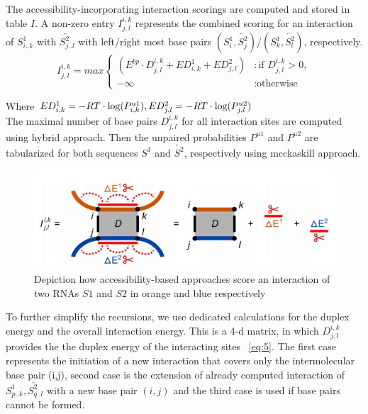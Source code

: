 \documentclass[twoside,a4paper]{report}
\begin{document}
	The accessibility-incorporating interaction scorings
	are computed and stored in table $I$. A non-zero entry $I^{i,k}_{j,l}$
	represents the combined scoring for an interaction of
	$S^1_{i..k}$ with $\overleftarrow{S^2_{j..l}}$ with
	left/right most base pairs $(S^1_i,\overleftarrow{S^2_j})$/$(S^1_k,\overleftarrow{S^2_l})$, respectively.\\


	\begin{equation}
	\label{eq:4}
	I^{i, k}_{j, l} = max \begin{cases}
	(E^{bp} \cdot D^{i, k}_{j, l} +ED^{1}_{i,k} +ED^{2}_{j, l}) & : \text{if } D^{i, k}_{j, l} > 0  ,\\-\infty & :\text{otherwise}
	\end{cases}
	\end{equation}
	
	 Where $ED^{1}_{i,k} = - RT \cdot \log(P^{u1}_{i,k}),\\ ED^{2}_{j, l} =  - RT \cdot \log(P^{u2}_{j, l})$\\
	 
	The maximal number of base pairs $D^{i,k}_{j,l}$ for all interaction sites are computed using hybrid approach. Then the  unpaired probabilities $P^{u1}$ and $P^{u2}$ are tabularized for both sequences $S^1$ and $\overleftarrow{S^2}$, respectively using mcckaskill approach.\\
	
	\begin{figure}[h]
		\includegraphics[width=0.9\linewidth]{access}
		\centering
		\caption{ Depiction how accessibility-based approaches score an interaction of two RNAs $S1$ and $S2$ in orange and blue respectively} 
		\label{fig:access}
	\end{figure}
	
	To further simplify the recursions, we use dedicated calculations for the duplex energy and the overall interaction energy. This is a 4-d matrix, in which $D^{i, k}_{j, l}$ provides the the duplex energy of the interacting sites ~\ref{eq:5}. 
	The first case represents the initiation of a new interaction that covers only the intermolecular base pair (i,j), second case is the extension of already computed interaction of  $S^1_{p..k}, \overleftarrow{S^2_{q..l}}$ with a new base pair $(i,j)$ and the third case is used if base pairs cannot be formed.\\
	
\end{document}
